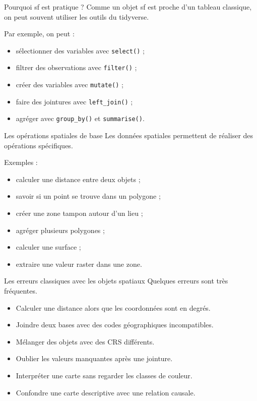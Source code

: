 \documentclass[
  10pt,
  ignorenonframetext,
]{beamer}
\begin{document}
\begin{frame}{Pourquoi sf est pratique ?}
\label{pourquoi-sf-est-pratique}
Comme un objet sf est proche d'un tableau classique, on peut souvent
utiliser les outils du tidyverse.

Par exemple, on peut :

\begin{itemize}
  \item sélectionner des variables avec \texttt{select()} ;
  \item filtrer des observations avec \texttt{filter()} ;
  \item créer des variables avec \texttt{mutate()} ;
  \item faire des jointures avec \texttt{left\_join()} ;
  \item agréger avec \texttt{group\_by()} et \texttt{summarise()}.
\end{itemize}
\end{frame}

\begin{frame}{Les opérations spatiales de base}
\label{les-opuxe9rations-spatiales-de-base}
Les données spatiales permettent de réaliser des opérations spécifiques.

Exemples :

\begin{itemize}
  \item calculer une distance entre deux objets ;
  \item savoir si un point se trouve dans un polygone ;
  \item créer une zone tampon autour d’un lieu ;
  \item agréger plusieurs polygones ;
  \item calculer une surface ;
  \item extraire une valeur raster dans une zone.
\end{itemize}
\end{frame}

\begin{frame}{Les erreurs classiques avec les objets spatiaux}
\label{les-erreurs-classiques-avec-les-objets-spatiaux}
Quelques erreurs sont très fréquentes.

\begin{itemize}
  \item Calculer une distance alors que les coordonnées sont en degrés.
  \item Joindre deux bases avec des codes géographiques incompatibles.
  \item Mélanger des objets avec des CRS différents.
  \item Oublier les valeurs manquantes après une jointure.
  \item Interpréter une carte sans regarder les classes de couleur.
  \item Confondre une carte descriptive avec une relation causale.
\end{itemize}
\end{frame}
\end{document}
